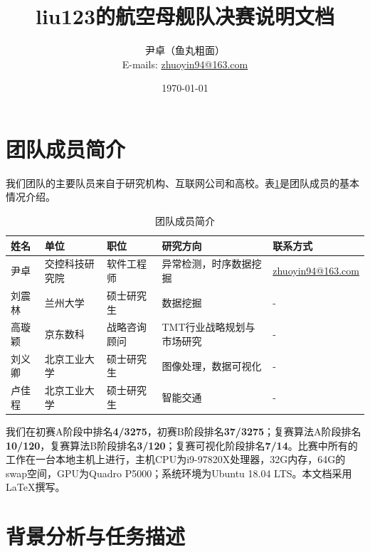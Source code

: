 \documentclass[UTF8, 12pt]{ctexart}
\begin{document}
	\title{\heiti \Huge{liu123的航空母舰队决赛说明文档}}
	\author{\kaishu 尹卓（鱼丸粗面） \\ E-mails: \href{mailto:zhuoyin94@163.com}{zhuoyin94@163.com}}
	\date{\today}
	\maketitle

	\tableofcontents
	\newpage
	\section{团队成员简介}
		我们团队的主要队员来自于研究机构、互联网公司和高校。表\ref{table_0}是团队成员的基本情况介绍。

		\begin{table}[H]
		\centering
		\small
		\caption{团队成员简介}
		\label{table_0}
		\renewcommand\arraystretch{0.9}
		\begin{tabular}{lllp{2.4cm}l}
			\toprule
			\textbf{姓名} & \textbf{单位} & \textbf{职位} & \textbf{研究方向} & \textbf{联系方式}\\
			\midrule
			尹卓\footnotemark[1] & 交控科技研究院 & 软件工程师 & 异常检测，时序数据挖掘 & \href{mailto:zhuoyin94@163.com}{zhuoyin94@163.com}\\
			刘震林 & 兰州大学 & 硕士研究生 & 数据挖掘 & - \\
			高璇颖 & 京东数科 & 战略咨询顾问 & TMT行业战略规划与市场研究 & - \\
			刘义卿 & 北京工业大学 & 硕士研究生 & 图像处理，数据可视化 & - \\
			卢佳程 & 北京工业大学 & 硕士研究生 & 智能交通 & - \\
			\bottomrule
		\end{tabular}
		\end{table}

		我们在初赛A阶段中排名\textbf{4/3275}，初赛B阶段排名\textbf{37/3275}；复赛算法A阶段排名\textbf{10/120}，复赛算法B阶段排名\textbf{3/120}；复赛可视化阶段排名\textbf{7/14}。比赛中所有的工作在一台本地主机上进行，主机CPU为i9-97820X处理器，32G内存，64G的swap空间，GPU为Quadro P5000；系统环境为Ubuntu 18.04 LTS。本文档采用 \LaTeX 撰写。

	\section{背景分析与任务描述}
\end{document}

